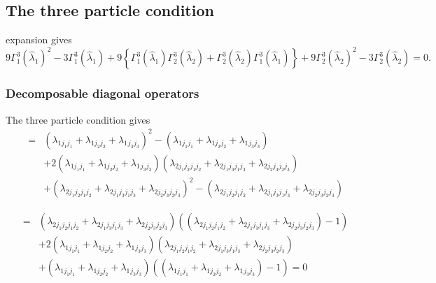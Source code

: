 \documentclass[12pt]{article}
\begin{document}
\subsection{The three particle condition}

expansion gives 
\begin{equation*}
9\Gamma _{1}^{3}\left( \hat{\lambda}_{1}\right) ^{2}-3\Gamma _{1}^{3}\left( 
\hat{\lambda}_{1}\right) +9\left\{ \Gamma _{1}^{3}\left( \hat{\lambda}%
_{1}\right) \Gamma _{2}^{3}\left( \hat{\lambda}_{2}\right) +\Gamma
_{2}^{3}\left( \hat{\lambda}_{2}\right) \Gamma _{1}^{3}\left( \hat{\lambda}%
_{1}\right) \right\} +9\Gamma _{2}^{3}\left( \hat{\lambda}_{2}\right)
^{2}-3\Gamma _{2}^{3}\left( \hat{\lambda}_{2}\right) =0.
\end{equation*}

\subsubsection{Decomposable diagonal operators}

The three particle condition gives 
\begin{eqnarray*}
&=&\left( \lambda _{1j_{1}j_{1}}+\lambda _{1j_{2}j_{2}}+\lambda
_{1}{}_{j_{3}j_{3}}\right) ^{2}-\left( \lambda _{1j_{1}j_{1}}+\lambda
_{1j_{2}j_{2}}+\lambda _{1}{}_{j_{3}j_{3}}\right) \\
&&+2\left( \lambda _{1j_{1}j_{1}}+\lambda _{1j_{2}j_{2}}+\lambda
_{1}{}_{j_{3}j_{3}}\right) \left( \lambda _{2j_{1}j_{2}j_{1}j_{2}}+\lambda
_{2j_{1}j_{3}j_{1}j_{3}}+\lambda _{2j_{2}j_{3}j_{2}j_{3}}\right) \\
&&+\left( \lambda _{2j_{1}j_{2}j_{1}j_{2}}+\lambda
_{2j_{1}j_{3}j_{1}j_{3}}+\lambda _{2j_{2}j_{3}j_{2}j_{3}}\right) ^{2}-\left(
\lambda _{2j_{1}j_{2}j_{1}j_{2}}+\lambda _{2j_{1}j_{3}j_{1}j_{3}}+\lambda
_{2j_{2}j_{3}j_{2}j_{3}}\right)
\end{eqnarray*}

\begin{eqnarray*}
&=&\left( \lambda _{2j_{1}j_{2}j_{1}j_{2}}+\lambda
_{2j_{1}j_{3}j_{1}j_{3}}+\lambda _{2j_{2}j_{3}j_{2}j_{3}}\right) \left(
\left( \lambda _{2j_{1}j_{2}j_{1}j_{2}}+\lambda
_{2j_{1}j_{3}j_{1}j_{3}}+\lambda _{2j_{2}j_{3}j_{2}j_{3}}\right) -1\right) \\
&&+2\left( \lambda _{1j_{1}j_{1}}+\lambda _{1j_{2}j_{2}}+\lambda
_{1}{}_{j_{3}j_{3}}\right) \left( \lambda _{2j_{1}j_{2}j_{1}j_{2}}+\lambda
_{2j_{1}j_{3}j_{1}j_{3}}+\lambda _{2j_{2}j_{3}j_{2}j_{3}}\right) \\
&&\left. +\right. \left( \lambda _{1j_{1}j_{1}}+\lambda
_{1j_{2}j_{2}}+\lambda _{1}{}_{j_{3}j_{3}}\right) \left( \left( \lambda
_{1j_{1}j_{1}}+\lambda _{1j_{2}j_{2}}+\lambda _{1}{}_{j_{3}j_{3}}\right)
-1\right) =0
\end{eqnarray*}
\end{document}
